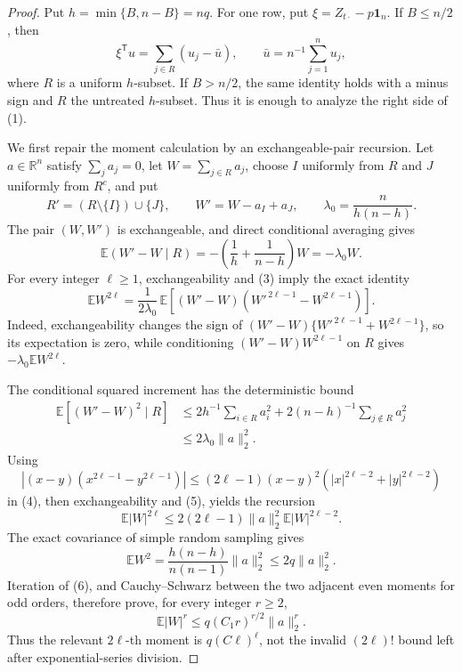 \documentclass{article}
\begin{document}
\begin{proof}
Put \(h=\min\{B,n-B\}=nq\).  For one row, put \(\xi=Z_{t\cdot}-p\mathbf 1_n\).  If \(B\le n/2\), then
\[
 \xi^{\mathsf T}u=\sum_{j\in R}(u_j-\bar u),
 \qquad \bar u=n^{-1}\sum_{j=1}^n u_j,
 \tag{1}
\]
where \(R\) is a uniform \(h\)-subset.  If \(B>n/2\), the same identity holds with a minus sign and \(R\) the untreated \(h\)-subset.  Thus it is enough to analyze the right side of (1).

We first repair the moment calculation by an exchangeable-pair recursion.  Let \(a\in\mathbb R^n\) satisfy \(\sum_j a_j=0\), let \(W=\sum_{j\in R}a_j\), choose \(I\) uniformly from \(R\) and \(J\) uniformly from \(R^c\), and put
\[
 R'=(R\setminus\{I\})\cup\{J\},
 \qquad W'=W-a_I+a_J,
 \qquad \lambda_0=\frac{n}{h(n-h)}.
 \tag{2}
\]
The pair \((W,W')\) is exchangeable, and direct conditional averaging gives
\[
 \mathbb E(W'-W\mid R)
 =-\left(\frac1h+\frac1{n-h}\right)W
 =-\lambda_0W.
 \tag{3}
\]
For every integer \(\ell\ge1\), exchangeability and (3) imply the exact identity
\[
 \mathbb EW^{2\ell}
 =\frac1{2\lambda_0}\,
 \mathbb E\!\left[(W'-W)
       (W'^{\,2\ell-1}-W^{2\ell-1})\right].
 \tag{4}
\]
Indeed, exchangeability changes the sign of
\((W'-W)\{W'^{\,2\ell-1}+W^{2\ell-1}\}\), so its expectation is zero, while conditioning
\((W'-W)W^{2\ell-1}\) on \(R\) gives
\(-\lambda_0\mathbb EW^{2\ell}\).

The conditional squared increment has the deterministic bound
\[
 \begin{aligned}
 \mathbb E\!\left[(W'-W)^2\mid R\right]
 &\le
 2h^{-1}\sum_{i\in R}a_i^2+
 2(n-h)^{-1}\sum_{j\notin R}a_j^2\\
 &\le2\lambda_0\lVert a\rVert_2^2.
 \end{aligned}
 \tag{5}
\]
Using
\[
 |(x-y)(x^{2\ell-1}-y^{2\ell-1})|
 \le(2\ell-1)(x-y)^2
       (|x|^{2\ell-2}+|y|^{2\ell-2})
\]
in (4), then exchangeability and (5), yields the recursion
\[
 \mathbb E|W|^{2\ell}
 \le2(2\ell-1)\lVert a\rVert_2^2
       \mathbb E|W|^{2\ell-2}.
 \tag{6}
\]
The exact covariance of simple random sampling gives
\[
 \mathbb EW^2
 =\frac{h(n-h)}{n(n-1)}\lVert a\rVert_2^2
 \le2q\lVert a\rVert_2^2.
\]
Iteration of (6), and Cauchy--Schwarz between the two adjacent even moments for odd orders, therefore prove, for every integer \(r\ge2\),
\[
 \mathbb E|W|^r
 \le q(C_1r)^{r/2}\lVert a\rVert_2^r.
 \tag{7}
\]
Thus the relevant \(2\ell\)-th moment is \(q(C\ell)^\ell\), not the invalid
\((2\ell)!\) bound left after exponential-series division.


\end{proof}
\end{document}
